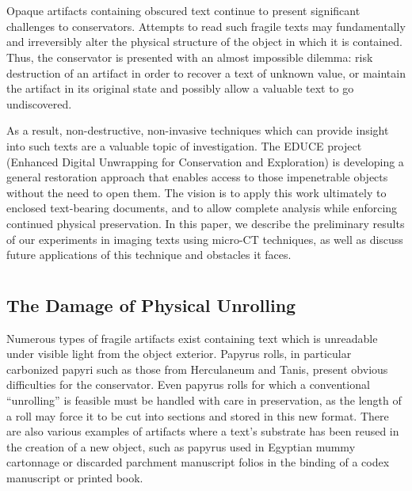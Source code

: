 \documentclass[12pt]{article}
\begin{document}
\title{}
\author{Ryan Baumann \\
\and Dorothy Carr Porter \\
\and W. Brent Seales}
\date{}

\maketitle

\section*{}

Opaque artifacts containing obscured text continue to present significant challenges to conservators.
Attempts to read such fragile texts may fundamentally and irreversibly alter the physical structure of the object in which it is contained.
Thus, the conservator is presented with an almost impossible dilemma:
risk destruction of an artifact in order to recover a text of unknown value,
or maintain the artifact in its original state and possibly allow a valuable text to go undiscovered.

As a result, non-destructive, non-invasive techniques which can provide insight into such texts are a valuable topic of investigation. The EDUCE project (Enhanced Digital Unwrapping for Conservation and Exploration) is developing a general restoration approach that enables access to those impenetrable objects without the need to open them. The vision is to apply this work ultimately to enclosed text-bearing documents, and to allow complete analysis while enforcing continued physical preservation. In this paper, we describe the preliminary results of our experiments in imaging texts using micro-CT techniques, as well as discuss future applications of this technique and obstacles it faces.

\section*{\bf{}}

\subsection*{The Damage of Physical Unrolling}

Numerous types of fragile artifacts exist containing text which is unreadable under visible light from the object exterior. Papyrus rolls, in particular carbonized papyri such as those from Herculaneum and Tanis, present obvious difficulties for the conservator. Even papyrus rolls for which a conventional ``unrolling'' is feasible must be handled with care in preservation, as the length of a roll may force it to be cut into sections and stored in this new format. There are also various examples of artifacts where a text's substrate has been reused in the creation of a new object, such as papyrus used in Egyptian mummy cartonnage or discarded parchment manuscript folios in the binding of a codex manuscript or printed book.
\end{document}
